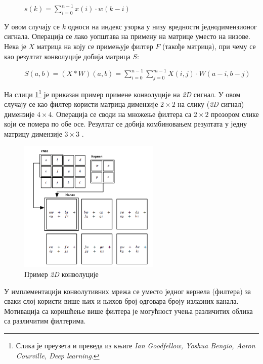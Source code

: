 \documentclass[11pt,oneside]{memoir}
\begin{document}
\begin{figure}[H]
  \centering
  $s(k) = \sum_{i=0}^{n-1} x(i)\cdot w(k-i)$
\end{figure}

У овом случају се $k$ односи на индекс узорка у низу вредности једнодимензионог сигнала. 
Операција се лако уопштава на примену на матрице уместо на низове. Нека је $X$ матрица на коју се примењује филтер $F$
(такође матрица), при чему се као резултат конволуције добија матрица $S$:

\begin{figure}[H]
  \centering
  $S(a, b) = (X*W)(a, b) = \sum_{i=0}^{n-1} \sum_{j=0}^{m-1} X(i, j) \cdot W(a-i, b-j)$
\end{figure}

На слици \ref{convolution}\footnote{Слика је преузета и преведа из књиге \textit{Ian Goodfellow, Yoshua Bengio, Aaron Courville, Deep learning}.}
је приказан пример примене конволуције на \textit{2D} сигнал. У овом случају се као филтер користи
матрица димензије $2\times 2$ на слику (\textit{2D} сигнал) димензије $4\times 4$. Операција се своди на множење 
филтера са $2\times 2$ прозором слике који се помера по обе осе. Резултат се добија комбиновањем резултата
у једну матрицу димензије $3\times 3$ \cite{deep_learning_goodfellow}.

\begin{figure}[H]
  \centering
  \includegraphics[width=0.6\textwidth]{images/convolution.png}
  \caption{Пример \textit{2D} конволуције\label{convolution}}
\end{figure}

У имплементацији конволутивних мрежа се уместо једног кернела (филтера) за сваки слој користи више њих и њихов број одговара броју излазних канала.
Мотивација са коришћење више филтера је могућност учења различитих облика са различитим филтерима.
\end{document}
